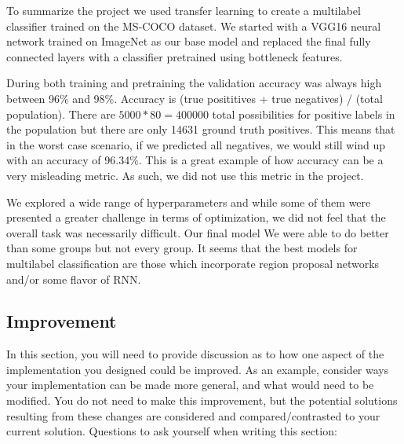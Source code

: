\documentclass[12pt,journal,compsoc]{IEEEtran}
\begin{document}

To summarize the project we used transfer learning to create a multilabel classifier trained on the MS-COCO dataset.  We started with a VGG16 neural network trained on ImageNet as our base model and replaced the final fully connected layers with a classifier pretrained using bottleneck features.  


During both training and pretraining the validation accuracy was always high between 96\% and 98\%. Accuracy is (true posititives + true negatives) / (total population).  There are $5000*80=400000$ total possibilities for positive labels in the population but there are only 14631 ground truth positives.  This means that in the worst case scenario, if we predicted all negatives, we would still wind up with an accuracy of 96.34\%. This is a great example of how accuracy can be a very misleading metric. As such, we did not use this metric in the project.



We explored a wide range of hyperparameters and while some of them were presented a greater challenge in terms of optimization, we did not feel that the overall task was necessarily difficult. Our final model We were able to do better than some groups but not every group. It seems that the best models for multilabel classification are those which incorporate region proposal networks and/or some flavor of RNN.

\subsection{Improvement}
In this section, you will need to provide discussion as to how one aspect of the implementation you designed could be improved. As an example, consider ways your implementation can be made more general, and what would need to be modified. You do not need to make this improvement, but the potential solutions resulting from these changes are considered and compared/contrasted to your current solution. Questions to ask yourself when writing this section:
\end{document}
